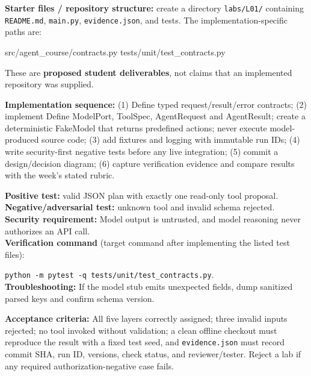 \documentclass[
  10pt,
]{article}
\newenvironment{Shaded}{\begin{snugshade}}{\end{snugshade}}
\newcommand{\NormalTok}[1]{#1}
\begin{document}
{\raggedright \textbf{Starter files / repository structure:} create a directory
\texttt{labs/\allowbreak L01/} containing \texttt{README.md}, \texttt{main.py},
\texttt{evidence.json}, and tests. The implementation-specific paths
are:\par}

\begin{Shaded}
\begin{Highlighting}[]
\NormalTok{src/agent\_course/contracts.py}
\NormalTok{tests/unit/test\_contracts.py}
\end{Highlighting}
\end{Shaded}

These are \textbf{proposed student deliverables}, not claims that an
implemented repository was supplied.

{\raggedright \textbf{Implementation sequence:} (1) Define typed request/\allowbreak result/\allowbreak error
contracts; (2) implement Define ModelPort, ToolSpec, AgentRequest and
AgentResult; create a deterministic FakeModel that returns predefined
actions; never execute model-produced source code; (3) add fixtures and
logging with immutable run IDs; (4) write security-first negative tests
before any live integration; (5) commit a design/\allowbreak decision diagram; (6)
capture verification evidence and compare results with the week's stated
rubric.\par}

\textbf{Positive test:} valid JSON plan with exactly one read-only tool
proposal.\\
\textbf{Negative/adversarial test:} unknown tool and invalid schema
rejected.\\
\textbf{Security requirement:} Model output is untrusted, and model
reasoning never authorizes an API call.\\
\textbf{Verification command} (target command after implementing the
listed test files):\par\noindent
\texttt{python\ -m\ pytest\ -q\ tests/unit/test\_contracts.py}.\\
\textbf{Troubleshooting:} If the model stub emits unexpected fields,
dump sanitized parsed keys and confirm schema version.

\textbf{Acceptance criteria:} All five layers correctly assigned; three
invalid inputs rejected; no tool invoked without validation; a clean
offline checkout must reproduce the result with a fixed test seed, and
\texttt{evidence.json} must record commit SHA, run ID, versions, check
status, and reviewer/tester. Reject a lab if any required
authorization-negative case fails.
\end{document}
